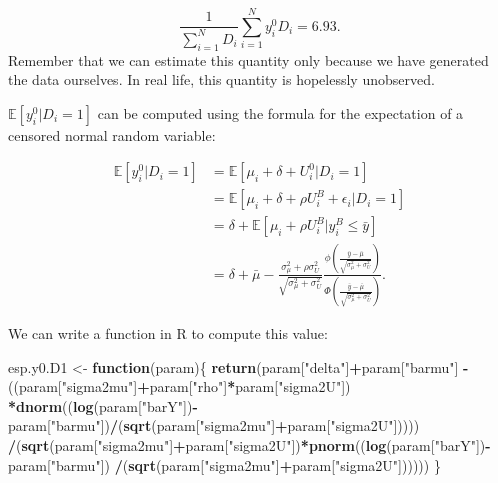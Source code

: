 \documentclass[]{book}
\newenvironment{Shaded}{\begin{snugshade}}{\end{snugshade}}
\newcommand{\ControlFlowTok}[1]{\textcolor[rgb]{0.13,0.29,0.53}{\textbf{#1}}}
\newcommand{\KeywordTok}[1]{\textcolor[rgb]{0.13,0.29,0.53}{\textbf{#1}}}
\newcommand{\NormalTok}[1]{#1}
\newcommand{\OperatorTok}[1]{\textcolor[rgb]{0.81,0.36,0.00}{\textbf{#1}}}
\newcommand{\StringTok}[1]{\textcolor[rgb]{0.31,0.60,0.02}{#1}}
\newcommand{\esp}[1]{\mathbb{E}[ #1 ]}
\theoremstyle{definition}
\theoremstyle{definition}
\theoremstyle{definition}
\theoremstyle{remark}
\begin{document}
\[
\frac{1}{\sum_{i=1}^ND_i}\sum_{i=1}^Ny_i^0D_i= 6.93.
\]
Remember that we can estimate this quantity only because we have generated the data ourselves.
In real life, this quantity is hopelessly unobserved.

\(\esp{y_i^0|D_i=1}\) can be computed using the formula for the expectation of a censored normal random variable:

\begin{align*}
\esp{y_i^0|D_i=1} & = \esp{\mu_i+\delta+U_i^0|D_i=1}\\
                  & = \esp{\mu_i+\delta+\rho U_i^B+\epsilon_i|D_i=1}\\
                  & = \delta + \esp{\mu_i+\rho U_i^B|y_i^B\leq\bar{y}}\\
                  & = \delta + \bar{\mu} - \frac{\sigma^2_{\mu}+\rho\sigma^2_U}{\sqrt{\sigma^2_{\mu}+\sigma^2_{U}}}\frac{\phi\left(\frac{\bar{y}-\bar{\mu}}{\sqrt{\sigma^2_{\mu}+\sigma^2_{U}}}\right)}{\Phi\left(\frac{\bar{y}-\bar{\mu}}{\sqrt{\sigma^2_{\mu}+\sigma^2_{U}}}\right)}.
\end{align*}

We can write a function in R to compute this value:

\begin{Shaded}
\begin{Highlighting}[]
\NormalTok{esp.y0.D1 <-}\StringTok{ }\ControlFlowTok{function}\NormalTok{(param)\{}
  \KeywordTok{return}\NormalTok{(param[}\StringTok{"delta"}\NormalTok{]}\OperatorTok{+}\NormalTok{param[}\StringTok{"barmu"}\NormalTok{]}
         \OperatorTok{-}\NormalTok{((param[}\StringTok{"sigma2mu"}\NormalTok{]}\OperatorTok{+}\NormalTok{param[}\StringTok{"rho"}\NormalTok{]}\OperatorTok{*}\NormalTok{param[}\StringTok{"sigma2U"}\NormalTok{])}
           \OperatorTok{*}\KeywordTok{dnorm}\NormalTok{((}\KeywordTok{log}\NormalTok{(param[}\StringTok{"barY"}\NormalTok{])}\OperatorTok{-}\NormalTok{param[}\StringTok{"barmu"}\NormalTok{])}\OperatorTok{/}\NormalTok{(}\KeywordTok{sqrt}\NormalTok{(param[}\StringTok{"sigma2mu"}\NormalTok{]}\OperatorTok{+}\NormalTok{param[}\StringTok{"sigma2U"}\NormalTok{]))))}
         \OperatorTok{/}\NormalTok{(}\KeywordTok{sqrt}\NormalTok{(param[}\StringTok{"sigma2mu"}\NormalTok{]}\OperatorTok{+}\NormalTok{param[}\StringTok{"sigma2U"}\NormalTok{])}\OperatorTok{*}\KeywordTok{pnorm}\NormalTok{((}\KeywordTok{log}\NormalTok{(param[}\StringTok{"barY"}\NormalTok{])}\OperatorTok{-}\NormalTok{param[}\StringTok{"barmu"}\NormalTok{])}
                                                          \OperatorTok{/}\NormalTok{(}\KeywordTok{sqrt}\NormalTok{(param[}\StringTok{"sigma2mu"}\NormalTok{]}\OperatorTok{+}\NormalTok{param[}\StringTok{"sigma2U"}\NormalTok{])))))}
\NormalTok{\}}
\end{Highlighting}
\end{Shaded}
\end{document}
